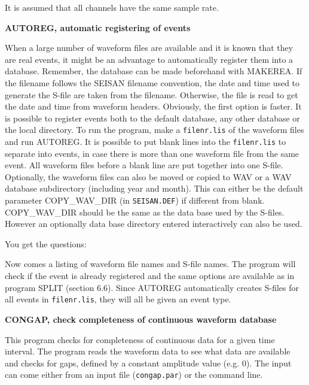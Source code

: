 It is assumed that all channels have the same sample rate. 

\textbf{AUTOREG, automatic registering of events}
\label{page:autoreg}

When a large number of waveform files are available and it is known 
that they are real events, it might be an advantage to 
automatically register them into a database. 
Remember, the database can be made 
beforehand with MAKEREA. 
If the filename follows the SEISAN filename convention,
the date and time used to generate the S-file are taken from the filename.
Otherwise, the file is read to get the date and time from waveform headers.
Obviously, the first option is faster.
It is possible to register events both to the default database, %
any other 
database or the local directory. To run the program, make a 
\texttt{filenr.lis} of the waveform files and run AUTOREG. It is 
possible to put blank lines into the \texttt{filenr.lis} to separate 
into events, in case there is more than one waveform file from the 
same event. All waveform files before a blank line are put together into one S-file. 
Optionally, the waveform files can also be moved or copied to
WAV or a WAV database subdirectory 
(including year and month). 
This can either be the default   parameter 
COPY\_WAV\_DIR (in \texttt{SEISAN.DEF}) if different from blank. COPY\_WAV\_DIR 
should be the same as the data base used by the S-files. However an 
optionally data base directory entered interactively can also be used.

You get the questions: 



Now comes a listing of waveform file names and S-file names. The 
program will check if the event is already registered and the same 
options are available as in program SPLIT (section 6.6). Since 
AUTOREG automatically creates S-files for all events in \texttt{filenr.lis}, 
they will all be given an event type.  

\textbf{CONGAP, check completeness of continuous waveform database}

This program checks for completeness of continuous data for a given time interval. The program reads the waveform data to see what data are available and checks for gaps, defined by a constant amplitude value (e.g. 0). The input can come either from an input file (\texttt{congap.par}) or the command line. 

